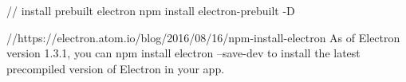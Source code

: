 // install prebuilt electron
npm install electron-prebuilt -D

//https://electron.atom.io/blog/2016/08/16/npm-install-electron
As of Electron version 1.3.1, you can npm install electron --save-dev to install the latest precompiled version of Electron in your app.

